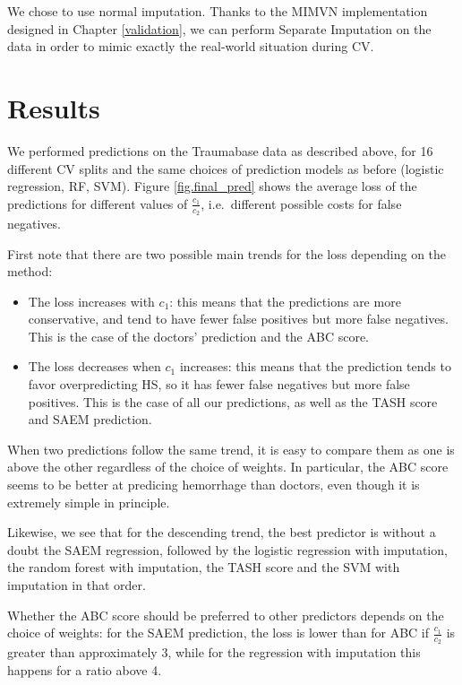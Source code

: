 We chose to use normal imputation. Thanks to the MIMVN implementation designed in Chapter \ref{validation}, we can perform Separate Imputation on the data in order to mimic exactly the real-world situation during CV.

	\section{Results}
We performed predictions on the Traumabase data as described above, for 16 different CV splits and the same choices of prediction models as before (logistic regression, RF, SVM). Figure \ref{fig.final_pred} shows the average loss of the predictions for different values of $\frac{c_1}{c_2}$, i.e.\ different possible costs for false negatives. 



First note that there are two possible main trends for the loss depending on the method:
\begin{itemize}
\item The loss increases with $c_1$: this means that the predictions are more conservative, and tend to have fewer false positives but more false negatives. This is the case of the doctors' prediction and the ABC score.
\item The loss decreases when $c_1$ increases: this means that the prediction tends to favor overpredicting HS, so it has fewer false negatives but more false positives. This is the case of all our predictions, as well as the TASH score and SAEM prediction.
\end{itemize}

When two predictions follow the same trend, it is easy to compare them as one is above the other regardless of the choice of weights. In particular, the ABC score seems to be better at predicing hemorrhage than doctors, even though it is extremely simple in principle.

Likewise, we see that for the descending trend, the best predictor is without a doubt the SAEM regression, followed by the logistic regression with imputation, the random forest with imputation, the TASH score and the SVM with imputation in that order.

Whether the ABC score should be preferred to other predictors depends on the choice of weights: for the SAEM prediction, the loss is lower than for ABC if $\frac{c_1}{c_2}$ is greater than approximately 3, while for the regression with imputation this happens for a ratio above 4.

